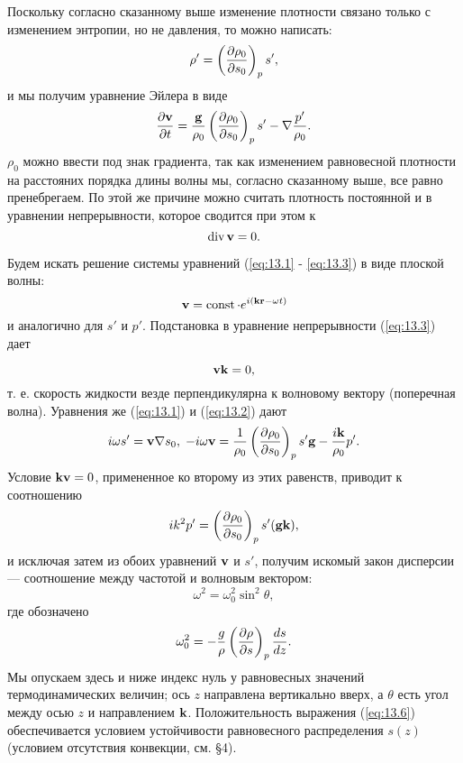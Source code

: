 Поскольку согласно сказанному выше изменение плотности связано только с
изменением энтропии, но не давления, то можно написать:
\[
   \rho' = \left( \frac{\partial{\rho_0}}{\partial{s_0}} \right)_{p} s',
\]
и мы получим уравнение Эйлера в виде
\begin{equation}
   \label{eq:13.2}
   \frac{\partial{{ \mathbf{v} }}}{\partial{t}} = \frac{ \mathbf{g}}{\rho_0}\left( \frac{\partial{\rho_0}}{\partial{s_0}} \right)_{p}s' - \nabla \frac{p'}{\rho_0}.
\end{equation}
$\rho_0$ можно ввести под знак градиента, так как изменением равновесной
плотности на расстояних порядка длины волны мы, согласно сказанному выше, все
равно пренебрегаем. По этой же причине можно считать плотность постоянной и в
уравнении непрерывности, которое сводится при этом к
\begin{equation}
   \label{eq:13.3}
    \mathop{\mathrm{div}}\nolimits { \mathbf{v} } = 0.
\end{equation}

Будем искать решение системы уравнений (\ref{eq:13.1} - \ref{eq:13.3}) в виде плоской волны:
\[
   {\mathbf{v}} = \mathop{\mathrm{const}}\nolimits \cdot e^{i(\mathbf{kr}-\omega t)}
\]
и аналогично для $s'$ и $p'$. Подстановка в уравнение непрерывности (\ref{eq:13.3}) дает

\begin{equation}
   \label{eq:13.4}
   \mathbf{vk}=0,
\end{equation}
т. е. скорость жидкости везде перпендикулярна к волновому вектору (поперечная
волна). Уравнения же (\ref{eq:13.1}) и (\ref{eq:13.2}) дают
\[
   i \omega s' = {\mathbf{v}} \nabla s_0, \;
   -i \omega { \mathbf{v} } = \frac1{\rho_0}\left( \frac{\partial{\rho_0}}{\partial{s_0}} \right)_{p} s' \mathbf{g} - \frac{i\mathbf{k}}{\rho_0}p'.
\]
Условие $\mathbf{kv} = 0$, примененное ко второму из этих равенств, приводит к
соотношению
\[
   ik^2p' = \left( \frac{\partial{\rho_0}}{\partial{s_0}} \right)_{p} s' (\mathbf{gk}),
\]
и исключая затем из обоих уравнений ${\mathbf{v}}$ и $s'$, получим искомый закон
дисперсии — соотношение между частотой и волновым вектором:
\begin{equation}
   \label{eq:13.5}
   \omega^2 = \omega^2_0 \sin^2\theta,
\end{equation}
где обозначено
\begin{equation}
   \label{eq:13.6}
   \omega^2_0 = - \frac{g}{\rho}\left( \frac{\partial{\rho}}{\partial{s}} \right)_{p}\frac{d{s}}{d{z}}.
\end{equation}
Мы опускаем здесь и ниже индекс нуль у равновесных значений термодинамических
величин; ось $z$ направлена вертикально вверх, а $\theta$ есть угол между осью
$z$ и направлением $\mathbf{k}$. Положительность выражения (\ref{eq:13.6}) обеспечивается
условием устойчивости равновесного распределения $s(z)$ (условием отсутствия
конвекции, см. \S4).


